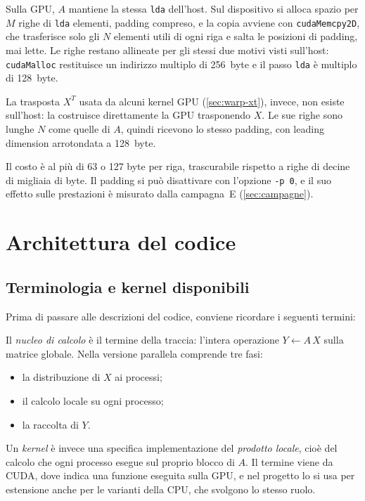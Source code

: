 \documentclass[11pt,a4paper]{article}
\begin{document}
Sulla GPU, $A$ mantiene la stessa \texttt{lda} dell'host. Sul dispositivo si
alloca spazio per $M$ righe di \texttt{lda} elementi, padding compreso, e la
copia avviene con \texttt{cudaMemcpy2D}, che trasferisce solo gli $N$ elementi
utili di ogni riga e salta le posizioni di padding, mai lette. Le righe
restano allineate per gli stessi due motivi visti sull'host:
\texttt{cudaMalloc} restituisce un indirizzo multiplo di \SI{256}{byte} e il
passo \texttt{lda} è multiplo di \SI{128}{byte}.

La trasposta $X^T$ usata da alcuni kernel GPU (\cref{sec:warp-xt}), invece,
non esiste sull'host: la costruisce direttamente la GPU trasponendo $X$. Le
sue righe sono lunghe $N$ come quelle di $A$, quindi ricevono lo stesso
padding, con leading dimension arrotondata a \SI{128}{byte}.

Il costo è al più di 63 o 127 byte per riga, trascurabile rispetto a righe di
decine di migliaia di byte. Il padding si può disattivare con l'opzione
\texttt{-p 0}, e il suo effetto sulle prestazioni è misurato dalla campagna~E
(\cref{sec:campagne}).

\section{Architettura del codice}\label{sec:architettura}

\subsection{Terminologia e kernel disponibili}\label{sec:terminologia}

Prima di passare alle descrizioni del codice, conviene ricordare i seguenti termini:

Il \emph{nucleo di calcolo} è il termine della traccia: l'intera operazione
$Y \leftarrow A\,X$ sulla matrice globale. Nella versione parallela comprende
tre fasi:
\begin{itemize}
  \item la distribuzione di $X$ ai processi;
  \item il calcolo locale su ogni processo;
  \item la raccolta di $Y$.
\end{itemize}

Un \emph{kernel} è invece una specifica implementazione del \emph{prodotto
locale}, cioè del calcolo che ogni processo esegue sul proprio blocco di $A$.
Il termine viene da CUDA, dove indica una funzione eseguita sulla GPU, e nel progetto lo si usa per estensione anche per le varianti della CPU, che
svolgono lo stesso ruolo.
\end{document}
